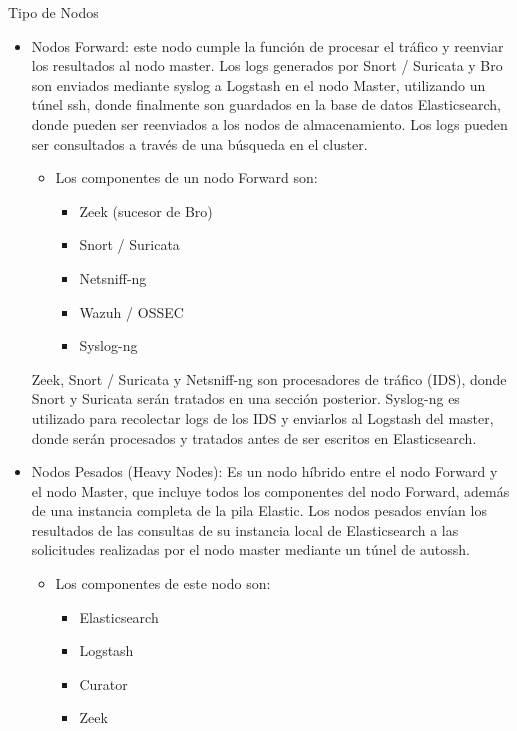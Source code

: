 \begin{subsubsection}{Tipo de Nodos}
\begin{itemize}
          \item Nodos Forward: este nodo cumple la función de procesar el tráfico y reenviar los resultados al nodo master. Los logs generados por Snort / Suricata y Bro son enviados mediante syslog a Logstash en el nodo Master, utilizando un túnel ssh, donde finalmente son guardados en la base de datos Elasticsearch, donde pueden ser reenviados a los nodos de almacenamiento. Los logs pueden ser consultados a través de una búsqueda en el cluster.
            \begin{itemize}
               \item Los componentes de un nodo Forward son:
               \begin{itemize}
                   \item Zeek \cite{zeek} (sucesor de Bro)
                   \item Snort \cite{snort} / Suricata \cite{suricata}
                   \item Netsniff-ng \cite{netsniff-ng}
                   \item Wazuh \cite{wazuh} / OSSEC \cite{ossec}
                   \item Syslog-ng \cite{syslog-ng}
               \end{itemize}
            \end{itemize}
            Zeek, Snort / Suricata y Netsniff-ng son procesadores de tráfico (IDS), donde Snort y Suricata serán tratados en una sección posterior. Syslog-ng es utilizado para recolectar logs de los IDS y enviarlos al Logstash del master, donde serán procesados y tratados antes de ser escritos en Elasticsearch.
            \item Nodos Pesados (Heavy Nodes): Es un nodo híbrido entre el nodo Forward y el nodo Master, que incluye todos los componentes del nodo Forward, además de una instancia completa de la pila Elastic. Los nodos pesados envían los resultados de las consultas de su instancia local de Elasticsearch a las solicitudes realizadas por el nodo master mediante un túnel de autossh.
            \begin{itemize}
                \item Los componentes de este nodo son:
                \begin{itemize}
                    \item Elasticsearch
                    \item Logstash
                    \item Curator
                    \item Zeek

\end{itemize}
\end{itemize}
\end{itemize}
\end{subsubsection}
